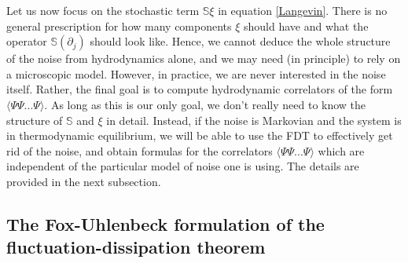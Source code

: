 \documentclass[a4paper, amsfonts, amssymb, amsmath, reprint, showkeys, nofootinbib, twoside,notitlepage,onecolumn]{revtex4-2}
\newcommand{\Ma}{{\mathbb{M}}}
\newcommand{\Sa}{{\mathbb{S}}}
\theoremstyle{definition}
\begin{document}
Let us now focus on the stochastic term $\Sa \xi$ in equation \eqref{Langevin}. There is no general prescription for how many components $\xi$ should have and what the operator $\Sa(\partial_j)$ should look like. Hence, we cannot deduce the whole structure of the noise from hydrodynamics alone, and we may need (in principle) to rely on a microscopic model. However, in practice, we are never interested in the noise itself. Rather, the final goal is to compute hydrodynamic correlators of the form $\langle \Psi \Psi ... \Psi\rangle$. As long as this is our only goal, we don't really need to know the structure of $\Sa$ and $\xi$ in detail. Instead, if the noise is Markovian and the system is in thermodynamic equilibrium, we will be able to use the FDT to effectively get rid of the noise, and obtain formulas for the correlators $\langle \Psi \Psi ... \Psi\rangle$ which are independent of the particular model of noise one is using. The details are provided in the next subsection.


\subsection{The Fox-Uhlenbeck formulation of the fluctuation-dissipation theorem}\label{FDTsection}
\end{document}
